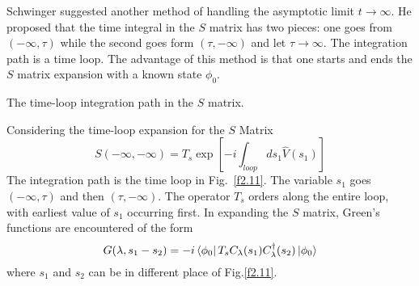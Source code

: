 Schwinger suggested another method of handling the asymptotic limit $t\to \infty$.
He proposed that the time integral in the $S$ matrix has two pieces: one goes from $(-\infty, \tau)$ while the second goes form $(\tau,-\infty)$ and let $\tau \to \infty$.
The integration path is a time loop.
The advantage of this method is that one starts and ends the $S$ matrix expansion with a known state $\phi_0$.
\begin{marginfigure}
  \caption{The time-loop integration path in the $S$ matrix.}
  \label{f2.11}
\end{marginfigure}

Considering the time-loop expansion for the $S$ Matrix
\begin{equation}
  \label{2.142}
  S(-\infty,-\infty) = T_s \exp [-i \int_{loop} d s_1 \hat{V}(s_1)]
\end{equation}
The integration path is the time loop in Fig.~\ref{f2.11}. The variable $s_1$ goes $(-\infty , \tau)$ and then $(\tau,-\infty)$. The operator $T_s $ orders along the entire loop, with earliest value of $s_1$ occurring first.
In expanding the $S$ matrix, Green's functions are encountered of the form
\begin{equation}
  \label{2.143}
  G(\lambda,s_1-s_2) = -i\bra{\phi_0}T_s C_\lambda(s_1) C_\lambda^\dagger(s_2) \ket{\phi_0}
\end{equation}
where $s_1$ and $s_2$ can be in different place of Fig.\ref{f2.11}.

